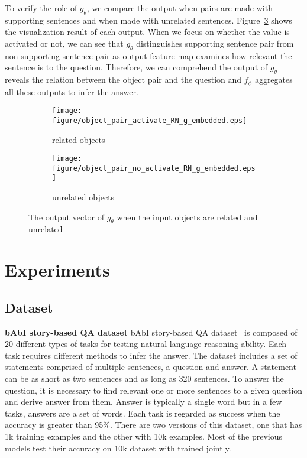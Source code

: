 \documentclass{article} \usepackage{iclr2018_conference,times}
\begin{document}
To verify the role of $g_\theta$, we compare the output when pairs are made with supporting sentences and when made with unrelated sentences.
Figure~\ref{fig:RN_g_theta} shows the visualization result of each output.
When we focus on whether the value is activated or not, we can see that $g_\theta$ distinguishes supporting sentence pair from non-supporting sentence pair as output feature map examines how relevant the sentence is to the question.
Therefore, we can comprehend the output of $g_\theta$ reveals the relation between the object pair and the question and $f_\phi$ aggregates all these outputs to infer the answer. 

\begin{figure}[h]
\centering
	\begin{subfigure}[b]{0.45\textwidth}
		\centering
		\texttt{[image: figure/object\_pair\_activate\_RN\_g\_embedded.eps]}
	\label{fig:related_pair_RN}
     \caption{related objects}
    \end{subfigure}
	\hspace{0.06\textwidth}
	\begin{subfigure}[b]{0.45\textwidth}
		\centering
		\texttt{[image: figure/object\_pair\_no\_activate\_RN\_g\_embedded.eps]}
	\label{fig:unrelated_pair_RN}
	\caption{unrelated objects}
	\end{subfigure}
\caption{The output vector of $g_\theta$ when the input objects are related and unrelated}
\label{fig:RN_g_theta}
\end{figure}



\section{Experiments}

\subsection{Dataset}
\label{section:4.1dataset}

\textbf{bAbI story-based QA dataset} \quad 
bAbI story-based QA dataset~\citep{Weston2015towards} is composed of 20 different types of tasks for testing natural language reasoning ability.
Each task requires different methods to infer the answer.
The dataset includes a set of statements comprised of multiple sentences, a question and answer.
A statement can be as short as two sentences and as long as 320 sentences.
To answer the question, it is necessary to find relevant one or more sentences to a given question and derive answer from them.
Answer is typically a single word but in a few tasks, answers are a set of words.  
Each task is regarded as success when the accuracy is greater than 95\%.
There are two versions of this dataset, one that has 1k training examples and the other with 10k examples.
Most of the previous models test their accuracy on 10k dataset with trained jointly.
\end{document}
